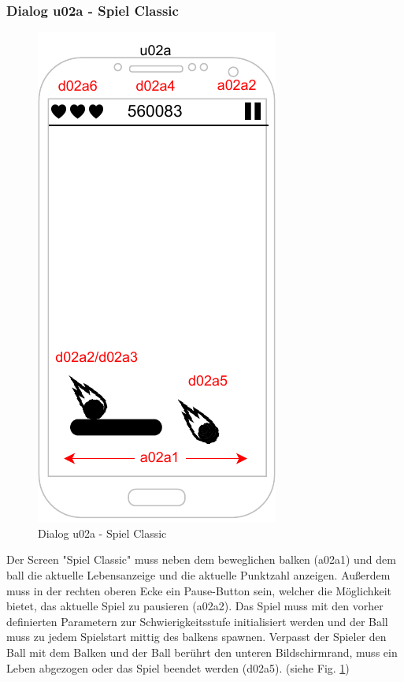 \subsubsection{Dialog u02a - Spiel Classic}\label{dialog:classic}

\begin{figure}[h!]
    \begin{center}
    \includegraphics[scale=1.4]{diagramme/pdf/Mockup-u02a.pdf}
    \end{center}
    \caption{Dialog u02a - Spiel Classic}\label{fig:dia:u02a}
\end{figure}

Der Screen "Spiel Classic" muss neben dem beweglichen \gls{balken} (a02a1) und dem \gls{ball} die aktuelle Lebensanzeige und die aktuelle Punktzahl anzeigen.
Außerdem muss in der rechten oberen Ecke ein Pause-Button sein, welcher die Möglichkeit bietet, das aktuelle Spiel zu pausieren (a02a2).
Das Spiel muss mit den vorher definierten Parametern zur Schwierigkeitsstufe initialisiert werden und der Ball muss zu jedem Spielstart mittig des \glspl{balken} spawnen.
Verpasst der Spieler den Ball mit dem Balken und der Ball berührt den unteren Bildschirmrand, muss ein Leben abgezogen oder das Spiel beendet werden (d02a5).
(siehe Fig. \ref{fig:dia:u02a})
\vspace*{1cm}
\clearpage

